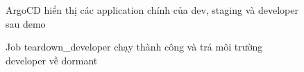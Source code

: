 \begin{figure}[H]
\centering
{}
\caption{ArgoCD hiển thị các application chính của dev, staging và developer sau demo}
\end{figure}

\begin{figure}[H]
\centering
{}
\caption{Job teardown\_developer chạy thành công và trả môi trường developer về dormant}
\end{figure}
